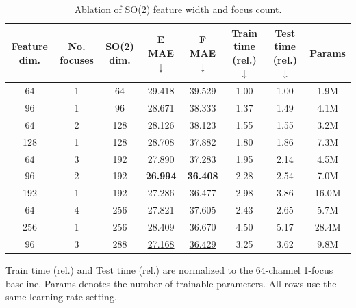 \begin{table}[ht]
    \centering
    \scriptsize
    \begin{threeparttable}
        \caption{Ablation of SO(2) feature width and focus count.}
        \label{tab:dpa4_focus_ablation}
        \begin{tabular}{@{}cccccccc@{}}
            \toprule
            \textbf{Feature dim.}                  &
            \textbf{No. focuses}                   &
            \textbf{SO(2) dim.}                    &
            \textbf{E MAE}$\downarrow$             &
            \textbf{F MAE}$\downarrow$             &
            \textbf{Train time (rel.)}$\downarrow$ &
            \textbf{Test time (rel.)}$\downarrow$  &
            \textbf{Params}                                                                                                  \\
            \midrule
            64                                     & 1 & 64  & 29.418             & 39.529             & 1.00 & 1.00 & 1.9M  \\
            96                                     & 1 & 96  & 28.671             & 38.333             & 1.37 & 1.49 & 4.1M  \\
            64                                     & 2 & 128 & 28.126             & 38.123             & 1.55 & 1.55 & 3.2M  \\
            128                                    & 1 & 128 & 28.708             & 37.882             & 1.80 & 1.86 & 7.3M  \\
            64                                     & 3 & 192 & 27.890             & 37.283             & 1.95 & 2.14 & 4.5M  \\
            96                                     & 2 & 192 & \textbf{26.994}    & \textbf{36.408}    & 2.28 & 2.54 & 7.0M  \\
            192                                    & 1 & 192 & 27.286             & 36.477             & 2.98 & 3.86 & 16.0M \\
            64                                     & 4 & 256 & 27.821             & 37.605             & 2.43 & 2.65 & 5.7M  \\
            256                                    & 1 & 256 & 28.409             & 36.670             & 4.50 & 5.17 & 28.4M \\
            96                                     & 3 & 288 & \underline{27.168} & \underline{36.429} & 3.25 & 3.62 & 9.8M  \\
            \bottomrule
        \end{tabular}
        \begin{tablenotes}
            \item[a] Train time (rel.) and Test time (rel.) are normalized to the 64-channel
            1-focus baseline. Params denotes the number of trainable parameters. All rows
            use the same learning-rate setting.
        \end{tablenotes}
    \end{threeparttable}
\end{table}

